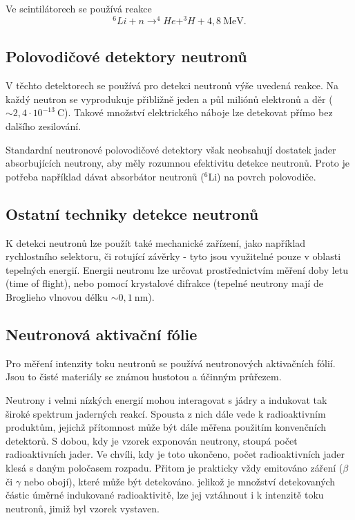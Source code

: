 \documentclass[../../main.tex]{subfiles}
\begin{document}
Ve scintilátorech se používá reakce
\begin{equation}
^{6}Li + n \rightarrow ^{4}He  + ^{3}H + 4,8 ~\mathrm{MeV}.
\end{equation}

\subsection{Polovodičové detektory neutronů}

V těchto detektorech se používá pro detekci neutronů výše uvedená reakce. Na každý neutron se vyprodukuje přibližně jeden a půl miliónů  elektronů a děr ($\sim 2,4 \cdotp 10^{-13} ~\mathrm{C}$). Takové množství elektrického náboje lze detekovat přímo bez dalšího zesilování.

Standardní neutronové polovodičové detektory však neobsahují dostatek jader absorbujících neutrony, aby měly rozumnou efektivitu detekce neutronů. Proto je potřeba například dávat absorbátor neutronů ($^{6}$Li) na povrch polovodiče. 

\subsection{Ostatní techniky detekce neutronů}

K detekci neutronů lze použít také mechanické zařízení, jako například rychlostního selektoru, či rotující závěrky - tyto jsou využitelné pouze v oblasti tepelných energií. Energii neutronu lze určovat prostřednictvím měření doby letu (time of flight), nebo pomocí krystalové difrakce (tepelné neutrony mají de Broglieho vlnovou délku $\sim 0,1 ~\mathrm{nm}$).

\subsection{Neutronová aktivační fólie}

Pro měření intenzity toku neutronů se používá neutronových aktivačních fólií. Jsou to čisté materiály se známou hustotou a účinným průřezem. 

Neutrony i velmi nízkých energií mohou interagovat s jádry a indukovat tak široké spektrum jaderných reakcí. Spousta z nich dále vede k radioaktivním produktům, jejichž přítomnost může být dále měřena použitím konvenčních detektorů. S dobou, kdy je vzorek exponován neutrony, stoupá počet radioaktivních jader. Ve chvíli, kdy je toto ukončeno, počet radioaktivních jader klesá s daným poločasem rozpadu. Přitom je prakticky vždy emitováno záření ($\beta$ či $\gamma$ nebo obojí), které může být detekováno. jelikož je množství detekovaných částic úměrné indukované radioaktivitě, lze jej vztáhnout i k intenzitě toku neutronů, jimiž byl vzorek vystaven.
\end{document}
